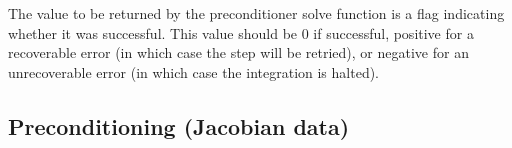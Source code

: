 {
  The value to be returned by the preconditioner solve function is a flag
  indicating whether it was successful.  This value should be $0$ if successful, 
  positive for a recoverable error (in which case the step will be retried), or
  negative for an unrecoverable error (in which case the integration is halted). 
}
{}

\subsection{Preconditioning (Jacobian data)}\label{ss:precondFn}

